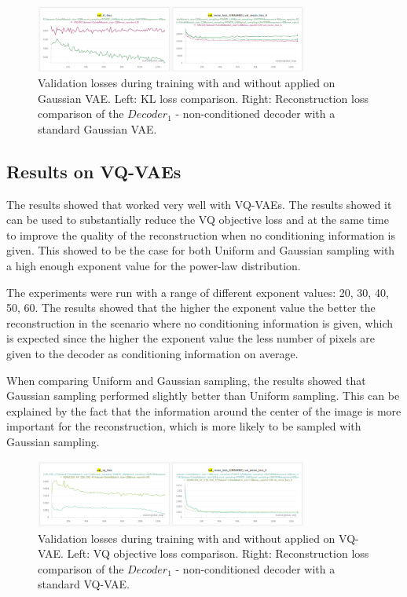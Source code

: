 \begin{figure}[H]
    \centering
    \includegraphics[width=0.8\textwidth]{figures/results/scvae1d/KL_and_recon.png}
    \caption[Validation loss during training with  applied on Gaussian VAE.]
    {
        Validation losses during training with and without  applied on Gaussian VAE.
        Left: KL loss comparison. Right: Reconstruction loss comparison of the $Decoder_1$ - non-conditioned decoder with a standard Gaussian VAE.
    }
    \label{fig:results_method2_gaussian_vae}
\end{figure}

\subsection{Results on VQ-VAEs}

The results showed that  worked very well with VQ-VAEs. The results showed it can be used to substantially reduce the VQ objective loss and at the same time to improve the quality of the reconstruction when no conditioning information is given. This showed to be the case for both Uniform and Gaussian sampling with a high enough exponent value for the power-law distribution.

The experiments were run with a range of different exponent values: 20, 30, 40, 50, 60. The results showed that the higher the exponent value the better the reconstruction in the scenario where no conditioning information is given, which is expected since the higher the exponent value the less number of pixels are given to the decoder as conditioning information on average.

When comparing Uniform and Gaussian sampling, the results showed that Gaussian sampling performed slightly better than Uniform sampling. This can be explained by the fact that the information around the center of the image is more important for the reconstruction, which is more likely to be sampled with Gaussian sampling.

\begin{figure}[H]
    \centering
    \includegraphics[width=0.8\textwidth]{figures/results/scvqvae1d/VQ_and_recon.png}
    \caption[Validation loss comparison during training of a VQ-VAE.]
    {
        Validation losses during training with and without  applied on VQ-VAE.
        Left: VQ objective loss comparison. Right: Reconstruction loss comparison of the $Decoder_1$ - non-conditioned decoder with a standard VQ-VAE.
    }
    \label{fig:results_method2_vq_vae}
\end{figure}

